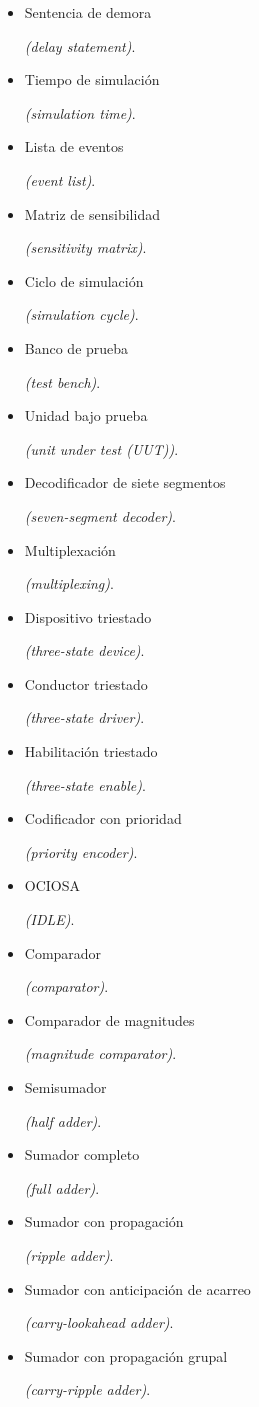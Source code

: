\begin{itemize}
    \item \hypertarget{delay_statement}{Sentencia de demora} \emph{(delay statement)}.
    \item \hypertarget{simulation_time}{Tiempo de simulación} \emph{(simulation time)}.
    \item \hypertarget{event_list}{Lista de eventos} \emph{(event list)}.
    \item \hypertarget{sensitivity_matrix}{Matriz de sensibilidad} \emph{(sensitivity matrix)}.
    \item \hypertarget{simulation_cycle}{Ciclo de simulación} \emph{(simulation cycle)}.
    \item \hypertarget{test_bench}{Banco de prueba} \emph{(test bench)}.
    \item \hypertarget{unit_under_test}{Unidad bajo prueba} \emph{(unit under test (UUT))}.
    \item \hypertarget{seven-segment_decoder}{Decodificador de siete segmentos} \emph{(seven-segment decoder)}.
    \item \hypertarget{multiplexing}{Multiplexación} \emph{(multiplexing)}.
    \item \hypertarget{threestate_device}{Dispositivo triestado} \emph{(three-state device)}.
    \item \hypertarget{threestate_driver}{Conductor triestado} \emph{(three-state driver)}.
    \item \hypertarget{threestate_enable}{Habilitación triestado} \emph{(three-state enable)}.
    \item \hypertarget{priority_encoder}{Codificador con prioridad} \emph{(priority encoder)}.
    \item \hypertarget{IDLE}{OCIOSA} \emph{(IDLE)}.
    \item \hypertarget{comparator}{Comparador} \emph{(comparator)}.
    \item \hypertarget{magnitude_comparator}{Comparador de magnitudes} \emph{(magnitude comparator)}.
    \item \hypertarget{half_adder}{Semisumador} \emph{(half adder)}.
    \item \hypertarget{full_adder}{Sumador completo} \emph{(full adder)}.
    \item \hypertarget{ripple_adder}{Sumador con propagación} \emph{(ripple adder)}.
    \item \hypertarget{carry-lookahead_adder}{Sumador con anticipación de acarreo} \emph{(carry-lookahead adder)}.
    \item \hypertarget{group-ripple_adder}{Sumador con propagación grupal} \emph{(carry-ripple adder)}.

\end{itemize}
